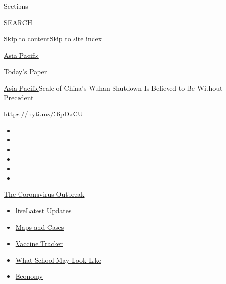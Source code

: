 Sections

SEARCH

\protect\hyperlink{site-content}{Skip to
content}\protect\hyperlink{site-index}{Skip to site index}

\href{https://www.nytimes.com/section/world/asia}{Asia Pacific}

\href{https://myaccount.nytimes.com/auth/login?response_type=cookie\&client_id=vi}{}

\href{https://www.nytimes.com/section/todayspaper}{Today's Paper}

\href{/section/world/asia}{Asia Pacific}\textbar{}Scale of China's Wuhan
Shutdown Is Believed to Be Without Precedent

\url{https://nyti.ms/36pDxCU}

\begin{itemize}
\item
\item
\item
\item
\item
\item
\end{itemize}

\href{https://www.nytimes.com/news-event/coronavirus?action=click\&pgtype=Article\&state=default\&region=TOP_BANNER\&context=storylines_menu}{The
Coronavirus Outbreak}

\begin{itemize}
\tightlist
\item
  live\href{https://www.nytimes.com/2020/08/02/world/coronavirus-updates.html?action=click\&pgtype=Article\&state=default\&region=TOP_BANNER\&context=storylines_menu}{Latest
  Updates}
\item
  \href{https://www.nytimes.com/interactive/2020/us/coronavirus-us-cases.html?action=click\&pgtype=Article\&state=default\&region=TOP_BANNER\&context=storylines_menu}{Maps
  and Cases}
\item
  \href{https://www.nytimes.com/interactive/2020/science/coronavirus-vaccine-tracker.html?action=click\&pgtype=Article\&state=default\&region=TOP_BANNER\&context=storylines_menu}{Vaccine
  Tracker}
\item
  \href{https://www.nytimes.com/interactive/2020/07/29/us/schools-reopening-coronavirus.html?action=click\&pgtype=Article\&state=default\&region=TOP_BANNER\&context=storylines_menu}{What
  School May Look Like}
\item
  \href{https://www.nytimes.com/live/2020/07/31/business/stock-market-today-coronavirus?action=click\&pgtype=Article\&state=default\&region=TOP_BANNER\&context=storylines_menu}{Economy}
\end{itemize}

